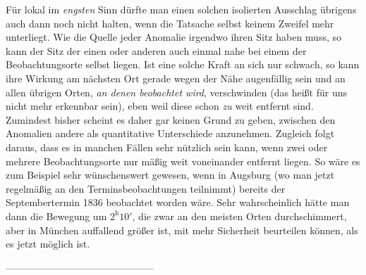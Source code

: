 Für lokal im \textit{engsten} Sinn dürfte man einen solchen isolierten Ausschlag übrigens auch dann noch nicht halten, wenn die Tatsache selbst keinem Zweifel mehr unterliegt. Wie die Quelle jeder Anomalie irgendwo ihren Sitz haben muss, so kann der Sitz der einen oder anderen auch einmal nahe bei einem der Beobachtungsorte selbst liegen. Ist eine solche Kraft an sich nur schwach, so kann ihre Wirkung am nächsten Ort gerade wegen der Nähe augenfällig sein und an allen übrigen Orten, \textit{an denen beobachtet wird}, verschwinden (das heißt für uns nicht mehr erkennbar sein), eben weil diese schon \textit{zu} weit entfernt sind. Zumindest bisher scheint es daher gar keinen Grund zu geben, zwischen den Anomalien andere als quantitative Unterschiede anzunehmen. Zugleich folgt daraus, dass es in manchen Fällen sehr nützlich sein kann, wenn zwei oder mehrere Beobachtungsorte nur mäßig weit voneinander entfernt liegen. So wäre es zum Beispiel sehr wünschenswert gewesen, wenn in Augsburg (wo man jetzt regelmäßig an den Terminsbeobachtungen teilnimmt) bereits der Septembertermin
1836 beobachtet worden wäre. Sehr wahrscheinlich hätte man dann die Bewegung um $2^{\mathrm h}10'$, die zwar an den meisten Orten durchschimmert, aber in München auffallend größer ist, mit mehr Sicherheit beurteilen können, als es jetzt möglich ist.
\begin{center}\small
---\enspace---\enspace---\enspace---\enspace---\enspace---\enspace---\enspace---\enspace---\enspace---\enspace---\enspace---\enspace---\enspace---\enspace---
\end{center}

